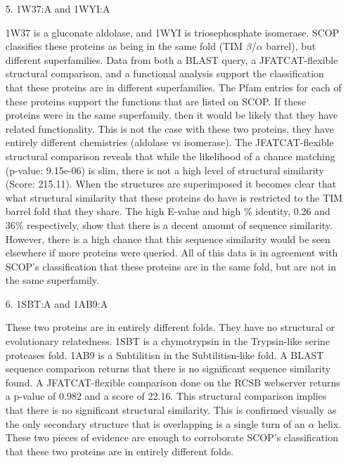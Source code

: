 \documentclass[11pt]{article}
\begin{document}
\begin{itemize}
\item[5.] 1W37:A and 1WYI:A

1W37 is a gluconate aldolase, and 1WYI is triosephosphate isomerase. SCOP classifies these proteins
as being in the same fold (TIM $\beta$/$\alpha$ barrel), but different superfamilies. Data from both 
a BLAST query, a JFATCAT-flexible structural comparison, and a functional analysis support the classification that these proteins 
are in different superfamilies. The Pfam entries for each of these proteins support the functions that are
listed on SCOP. If these proteins were in the same superfamily, then it would be likely that they have 
related functionality. This is not the case with these two proteins, they have entirely different chemistries (aldolase vs isomerase).
The JFATCAT-flexible structural comparison reveals that while the likelihood of a chance matching (p-value: 9.15e-06) is slim, 
there is not a high level of structural similarity (Score: 215.11). When the structures are superimposed it becomes clear
that what structural similarity that these proteins do have is restricted to the TIM barrel fold that they share. The high E-value 
and high \% identity, 0.26 and 36\% respectively, show that there is a decent amount of sequence similarity. However, there is a high 
chance that this sequence similarity would be seen elsewhere if more proteins were queried. All of this data is in agreement 
with SCOP's classification that these proteins are in the same fold, but are not in the same superfamily.

\item[6.] 1SBT:A and 1AB9:A

These two proteins are in entirely different folds. They have no structural or evolutionary relatedness. 
1SBT is a chymotrypsin in the Trypsin-like serine proteases fold. 1AB9 is a Subtilitisn in the
Subtilitisn-like fold. A BLAST sequence comparison returns that there is no significant sequence similarity found. 
A JFATCAT-flexible comparison done on the RCSB webserver returns a p-value of 0.982 and a score of 22.16.
This structural comparison implies that there is no significant structural similarity. This is confirmed visually as the
only secondary structure that is overlapping is a single turn of an $\alpha$ helix. These two pieces of evidence are
enough to corroborate SCOP's classification that these two proteins are in entirely different folds.

\end{itemize}
\end{document}
